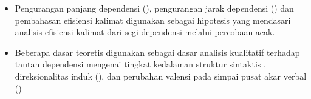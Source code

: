 \begin{itemize}
	\begin{itemize}
		\item Pengurangan panjang dependensi (\citealp{temperley2007minimization, temperley2008dependency, gildea2010grammars}), pengurangan jarak dependensi (\citealp{liu2008dependency, liu2017dependency}) dan pembahasan efisiensi kalimat \citep{hawkins2004efficiency} digunakan sebagai hipotesis yang mendasari analisis efisiensi kalimat dari segi dependensi melalui percobaan acak.
		\item Beberapa dasar teoretis digunakan sebagai dasar analisis kualitatif terhadap tautan dependensi mengenai tingkat kedalaman struktur sintaktis \citep{yngve1960model}, direksionalitas induk (\citealp{dryer1992greenbergian, temperley2008dependency}), dan perubahan valensi pada simpai pusat akar verbal (\citealp{hudson2007language, welke2002deutsche})
	\end{itemize}
\end{itemize}
	


